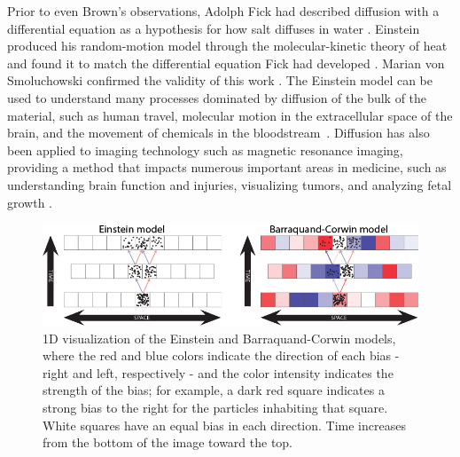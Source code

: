 Prior to even Brown’s observations, Adolph Fick had described diffusion with a differential equation as a hypothesis for how salt diffuses in water \cite{fick_v_1855}. Einstein produced his random-motion model through the molecular-kinetic theory of heat and found it to match the differential equation Fick had developed \cite{einstein_uber_1905}. Marian von Smoluchowski confirmed the validity of this work \cite{von_smoluchowski_zur_1906}. The Einstein model can be used to understand many processes dominated by diffusion of the bulk of the material, such as human travel, molecular motion in the extracellular space of the brain, and the movement of chemicals in the bloodstream~\cite{gonzalez_understanding_2008, nicholson_extracellular_1998, ursino_mathematical_1989, zhang_lattice_2019}. Diffusion has also been applied to imaging technology such as magnetic resonance imaging, providing a method that impacts numerous important areas in medicine, such as understanding brain function and injuries, visualizing tumors, and analyzing fetal growth \cite{le_bihan_mr_1986, le_bihan_diffusion_2014, wijman_prognostic_2009, low_diffusion-weighted_2007, han_assessment_2015, abdel_razek_apparent_2019}.  

\begin{figure}[hb]
\includegraphics[width=0.8\columnwidth]{Figures/model_both_sidebyside.png}
\caption{\label{fig:1D_BC} 1D visualization of the Einstein and Barraquand-Corwin models, where the red and blue colors indicate the direction of each bias - right and left, respectively - and the color intensity indicates the strength of the bias; for example, a dark red square indicates a strong bias to the right for the particles inhabiting that square. White squares have an equal bias in each direction. Time increases from the bottom of the image toward the top.}
\end{figure}

